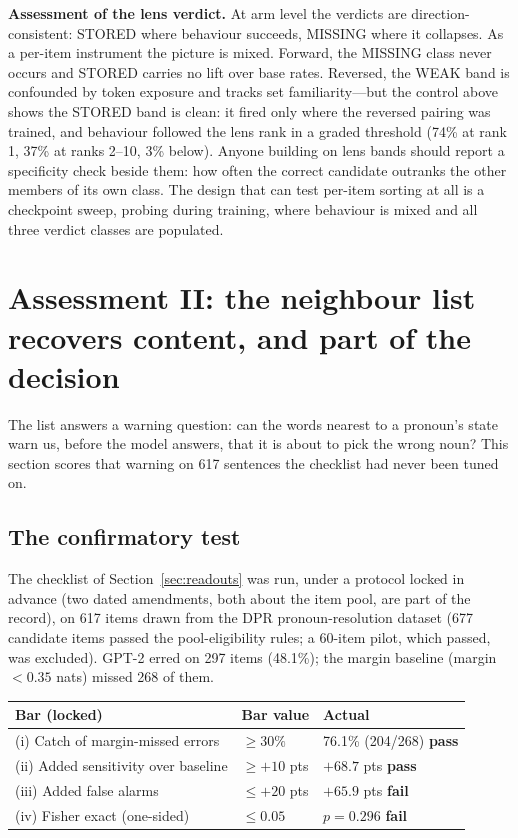 \documentclass[11pt]{article}
\begin{document}
\textbf{Assessment of the lens verdict.} At arm level the verdicts are direction-consistent: STORED where behaviour succeeds, MISSING where it collapses. As a per-item instrument the picture is mixed. Forward, the MISSING class never occurs and STORED carries no lift over base rates. Reversed, the WEAK band is confounded by token exposure and tracks set familiarity---but the control above shows the STORED band is clean: it fired only where the reversed pairing was trained, and behaviour followed the lens rank in a graded threshold (74\% at rank 1, 37\% at ranks 2--10, 3\% below). Anyone building on lens bands should report a specificity check beside them: how often the correct candidate outranks the other members of its own class. The design that can test per-item sorting at all is a checkpoint sweep, probing during training, where behaviour is mixed and all three verdict classes are populated.

\section{Assessment II: the neighbour list recovers content, and part of the decision}
\label{sec:list}

The list answers a warning question: can the words nearest to a
pronoun's state warn us, before the model answers, that it is about
to pick the wrong noun? This section scores that warning on 617
sentences the checklist had never been tuned on.

\subsection{The confirmatory test}

The checklist of Section~\ref{sec:readouts} was run, under a protocol
locked in advance (two dated amendments, both about the item pool, are
part of the record), on 617 items drawn from the DPR pronoun-resolution
dataset \cite{dpr2012} (677 candidate items passed the pool-eligibility
rules; a 60-item pilot, which passed, was excluded). GPT-2 erred on
297 items (48.1\%); the margin baseline (margin $< 0.35$ nats) missed
268 of them.

\begin{center}
\begin{tabular}{lll}
\toprule
Bar (locked) & Bar value & Actual \\
\midrule
(i) Catch of margin-missed errors & $\ge 30\%$ & 76.1\% (204/268) \textbf{pass} \\
(ii) Added sensitivity over baseline & $\ge +10$ pts & $+68.7$ pts \textbf{pass} \\
(iii) Added false alarms & $\le +20$ pts & $+65.9$ pts \textbf{fail} \\
(iv) Fisher exact (one-sided) & $\le 0.05$ & $p = 0.296$ \textbf{fail} \\
\bottomrule
\end{tabular}
\end{center}
\end{document}
